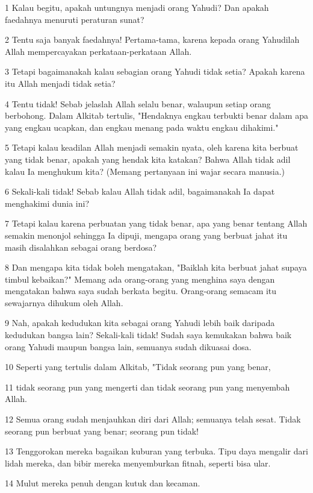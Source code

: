 \par 1 Kalau begitu, apakah untungnya menjadi orang Yahudi? Dan apakah faedahnya menuruti peraturan sunat?
\par 2 Tentu saja banyak faedahnya! Pertama-tama, karena kepada orang Yahudilah Allah mempercayakan perkataan-perkataan Allah.
\par 3 Tetapi bagaimanakah kalau sebagian orang Yahudi tidak setia? Apakah karena itu Allah menjadi tidak setia?
\par 4 Tentu tidak! Sebab jelaslah Allah selalu benar, walaupun setiap orang berbohong. Dalam Alkitab tertulis, "Hendaknya engkau terbukti benar dalam apa yang engkau ucapkan, dan engkau menang pada waktu engkau dihakimi."
\par 5 Tetapi kalau keadilan Allah menjadi semakin nyata, oleh karena kita berbuat yang tidak benar, apakah yang hendak kita katakan? Bahwa Allah tidak adil kalau Ia menghukum kita? (Memang pertanyaan ini wajar secara manusia.)
\par 6 Sekali-kali tidak! Sebab kalau Allah tidak adil, bagaimanakah Ia dapat menghakimi dunia ini?
\par 7 Tetapi kalau karena perbuatan yang tidak benar, apa yang benar tentang Allah semakin menonjol sehingga Ia dipuji, mengapa orang yang berbuat jahat itu masih disalahkan sebagai orang berdosa?
\par 8 Dan mengapa kita tidak boleh mengatakan, "Baiklah kita berbuat jahat supaya timbul kebaikan?" Memang ada orang-orang yang menghina saya dengan mengatakan bahwa saya sudah berkata begitu. Orang-orang semacam itu sewajarnya dihukum oleh Allah.
\par 9 Nah, apakah kedudukan kita sebagai orang Yahudi lebih baik daripada kedudukan bangsa lain? Sekali-kali tidak! Sudah saya kemukakan bahwa baik orang Yahudi maupun bangsa lain, semuanya sudah dikuasai dosa.
\par 10 Seperti yang tertulis dalam Alkitab, "Tidak seorang pun yang benar,
\par 11 tidak seorang pun yang mengerti dan tidak seorang pun yang menyembah Allah.
\par 12 Semua orang sudah menjauhkan diri dari Allah; semuanya telah sesat. Tidak seorang pun berbuat yang benar; seorang pun tidak!
\par 13 Tenggorokan mereka bagaikan kuburan yang terbuka. Tipu daya mengalir dari lidah mereka, dan bibir mereka menyemburkan fitnah, seperti bisa ular.
\par 14 Mulut mereka penuh dengan kutuk dan kecaman.
